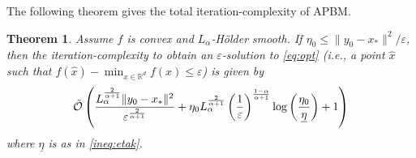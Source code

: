 \documentclass[11pt,letterpaper]{article}
\newtheorem{theorem}[thm]{Theorem}
\newcommand{\R}{\mathbb{R}}
\begin{document}
The following theorem gives the total iteration-complexity of APBM. 

\begin{theorem}
    Assume $f$ is convex and $L_\alpha$-Hölder smooth. If $\eta_0\le \|y_0-x_*\|^2/\varepsilon$, then the iteration-complexity to obtain an $\varepsilon$-solution to \eqref{eq:opt} (i.e., a point $\hat x$ such that $f(\hat x)-\min_{x\in \R^d} f(x) \le \varepsilon$) is given by
    \begin{equation}\label{bound:total}
        \tilde {\cal O} \left( \frac{L_\alpha^{\frac{2}{\alpha+1}} \|y_0-x_*\|^2}{\varepsilon^{\frac{2}{\alpha+1}}}
        + \eta_0 L_\alpha^{\frac{2}{\alpha+1}} \left(\frac{1}{\varepsilon}\right)^{\frac{1-\alpha}{\alpha+1}}
        \log\left(\frac{\eta_0}{\underline{\eta}}\right) + 1 \right)
    \end{equation}
    where $\underline{\eta}$ is as in \eqref{ineq:etak}.
\end{theorem}
\end{document}
